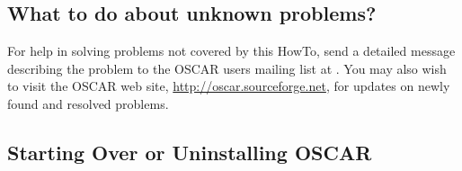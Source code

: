 \endchange



\subsection{What to do about unknown problems?}

For help in solving problems not covered by this HowTo, send a
detailed message describing the problem to the OSCAR users mailing
list at . You may also wish
to visit the OSCAR web site, \url{http://oscar.sourceforge.net}, for
updates on newly found and resolved problems.

\subsection{Starting Over or Uninstalling OSCAR}

